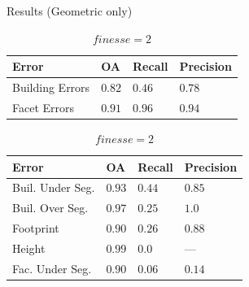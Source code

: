 \documentclass{beamer}
\begin{document}
            \begin{frame}[plain]{Results (Geometric only)}
                \begin{table}
                    \begin{subtable}{.4\textwidth}
                        \tiny
                        \begin{center}
                            \begin{tabular}{x{1cm} x{.5cm} x{.5cm} x{.5cm}}
                                \toprule
                                {\bf Error} & {\bf OA} & {\bf Recall} & {\bf Precision} \\
                                \midrule
                                Building Errors & $0.82$ & $0.46$ & $0.78$ \\
                                \midrule
                                Facet Errors & $0.91$ & $0.96$ & $0.94$ \\
                                \bottomrule
                            \end{tabular}
                            \caption{\tiny\label{tab::finesse2} $finesse = 2$}
                        \end{center}
                    \end{subtable}
                    \begin{subtable}{.45\textwidth}
                        \tiny
                        \begin{center}
                            \begin{tabular}{x{1.75cm} x{.5cm} x{.5cm} x{.5cm}}
                                \toprule
                                {\bf Error} & {\bf OA} & {\bf Recall} & {\bf Precision} \\
                                \midrule
                                Buil. Under Seg. & $0.93$ & $0.44$ & $0.85$ \\
                                \midrule
                                Buil. Over Seg. & $0.97$ & $0.25$ & $1.0$ \\
                                \midrule
                                Footprint & $0.90$ & $0.26$ & $0.88$ \\
                                \midrule
                                Height & $0.99$ & $0.0$ & --- \\
                                \midrule
                                \midrule
                                Fac. Under Seg. & $0.90$ & $0.06$ & $0.14$ \\

\end{tabular}
\end{center}
\end{subtable}
\end{table}
\end{frame}
\end{document}
